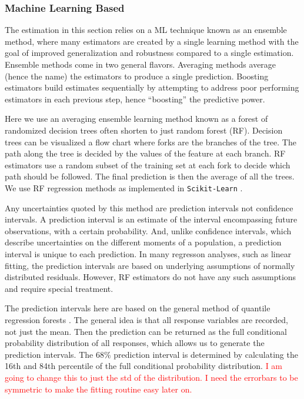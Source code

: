 \documentclass[fleqn,usenatbib]{mnras}
\newcommand{\editorial}[1]{\textcolor{red}{#1}}
\begin{document}
\subsubsection{Machine Learning Based}\label{sec:machine learning method}
The estimation in this section relies on a ML technique known as an ensemble method, where many estimators are created by a single learning method with the goal of improved generalization and robustness compared to a single estimation. Ensemble methods come in two general flavors. Averaging methods average (hence the name) the estimators to produce a single prediction. Boosting estimators build estimates sequentially by attempting to address poor performing estimators in each previous step, hence ``boosting'' the predictive power.

Here we use an averaging ensemble learning method known as a forest of randomized decision trees often shorten to just random forest (RF). Decision trees can be visualized a flow chart where forks are the branches of the tree. The path along the tree is decided by the values of the feature at each branch. RF estimators use a random subset of the training set at each fork to decide which path should be followed. The final prediction is then the average of all the trees. We use RF regression methods as implemented in {\tt Scikit-Learn} \citep{Pedregosa2012}.

Any uncertainties quoted by this method are prediction intervals not confidence intervals. A prediction interval is an estimate of the interval encompassing future observations, with a certain probability. And, unlike confidence intervals, which describe uncertainties on the different moments of a population, a prediction interval is unique to each prediction. In many regresson analyses, such as linear fitting, the prediction intervals are based on underlying assumptions of normally distributed residuals. However, RF estimators do not have any such assumptions and require special treatment.

The prediction intervals here are based on the general method of quantile regression forests \citep{Meinshausen2006}. The general idea is that all response variables are recorded, not just the mean. Then the prediction can be returned as the full conditional probability distribution of all responses, which allows us to generate the prediction intervals. The 68\% prediction interval is determined by calculating the 16th and 84th percentile of the full conditional probability distribution. \editorial{I am going to change this to just the std of the distribution. I need the errorbars to be symmetric to make the fitting routine easy later on.}
\end{document}
